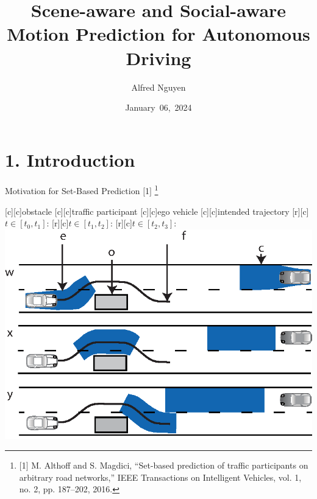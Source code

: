 \documentclass[shortpres,aspectratio=43]{beamer}
\title[Title]{Scene-aware and Social-aware Motion
Prediction for Autonomous Driving}
\author[Name]{Alfred Nguyen}
\institute[TU M\"unchen]{Technical University of Munich}
\date{January~06,~2024}
\newcommand\blfootnote[1]{%
  \begingroup
  \renewcommand\thefootnote{}\footnote{#1}%
  \addtocounter{footnote}{-1}%
  \endgroup
}
\begin{document}


\begin{frame}[plain]
    \titlepage
\end{frame}


\section{1. Introduction}

\begin{frame}{Motivation for Set-Based Prediction $[$1$]$}
\blfootnote{\tiny $[$1$]$ M. Althoff and S. Magdici, ``Set-based prediction of traffic participants on arbitrary road networks,'' IEEE Transactions on Intelligent Vehicles, vol. 1, no. 2, pp. 187--202, 2016.}

	\centering	
	\footnotesize
      [c][c]{obstacle}						
      [c][c]{traffic participant}
      [c][c]{ego vehicle}
      [c][c]{intended trajectory}      
      [r][c]{$t \in [t_0, t_1]$:}
      [r][c]{$t \in [t_1, t_2]$:}
      [r][c]{$t \in [t_2, t_3]$:}
      \includegraphics[width=0.8\columnwidth, height=0.74\textheight, keepaspectratio]{./figures/snapshots_blue.eps}
\end{frame}
\end{document}
